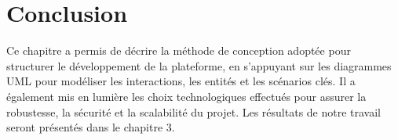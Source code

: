 \section*{Conclusion}

Ce chapitre a permis de décrire la méthode de conception adoptée pour 
structurer le développement de la plateforme, en s'appuyant sur les 
diagrammes UML pour modéliser les interactions, les entités et les 
scénarios clés. Il a également mis en lumière les choix technologiques 
effectués pour assurer la robustesse, la sécurité et la scalabilité du 
projet. Les résultats de notre travail seront présentés dans le 
chapitre 3.
